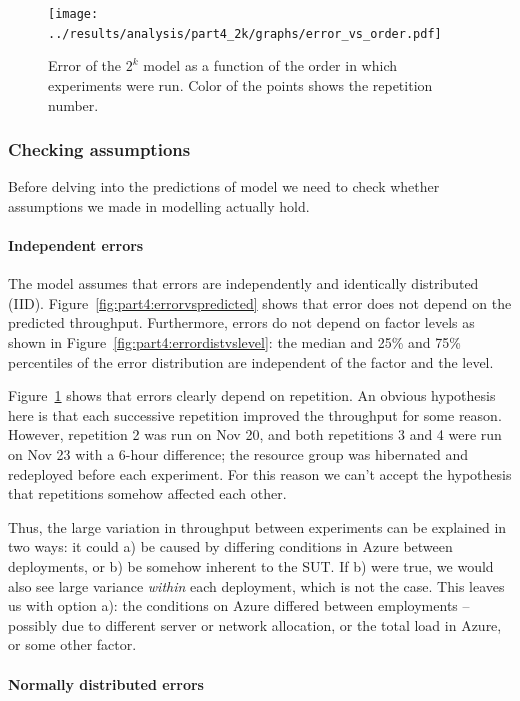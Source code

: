 \documentclass[11pt]{article}
\begin{document}
\begin{figure}[h]
\centering
\texttt{[image: ../results/analysis/part4\_2k/graphs/error\_vs\_order.pdf]}
\caption{Error of the $2^k$ model as a function of the order in which experiments were run. Color of the points shows the repetition number.}
\label{fig:part4:errorvsorder}
\end{figure}


\subsubsection{Checking assumptions}

Before delving into the predictions of model we need to check whether assumptions we made in modelling actually hold.

\paragraph{Independent errors}

The model assumes that errors are independently and identically distributed (IID). Figure~\ref{fig:part4:errorvspredicted} shows that error does not depend on the predicted throughput. Furthermore, errors do not depend on factor levels as shown in Figure~\ref{fig:part4:errordistvslevel}: the median and 25\% and 75\% percentiles of the error distribution are independent of the factor and the level.

Figure~\ref{fig:part4:errorvsorder} shows that errors clearly depend on repetition. An obvious hypothesis here is that each successive repetition improved the throughput for some reason. However, repetition 2 was run on Nov 20, and both repetitions 3 and 4 were run on Nov 23 with a 6-hour difference; the resource group was hibernated and redeployed before each experiment. For this reason we can't accept the hypothesis that repetitions somehow affected each other.

Thus, the large variation in throughput between experiments can be explained in two ways: it could a) be caused by differing conditions in Azure between deployments, or b) be somehow inherent to the SUT. If b) were true, we would also see large variance \emph{within} each deployment, which is not the case. This leaves us with option a): the conditions on Azure differed between employments -- possibly due to different server or network allocation, or the total load in Azure, or some other factor.

\paragraph{Normally distributed errors}
\end{document}
